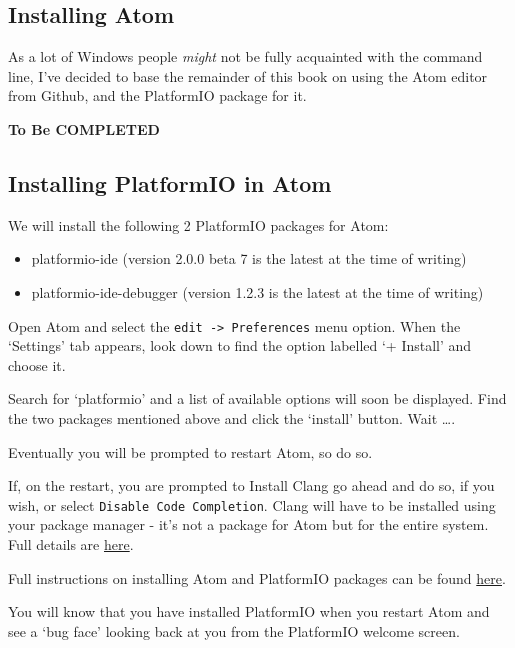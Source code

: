 \subsection{Installing Atom}\label{installing-atom}

As a lot of Windows people \emph{might} not be fully acquainted with the command
line, I've decided to base the remainder of this book on using the Atom editor
from Github, and the PlatformIO package for it. 

\textbf{To Be COMPLETED}

\subsection{Installing PlatformIO in
Atom}\label{installing-platformio-in-atom}

We will install the following 2 PlatformIO packages for Atom:

\begin{itemize}
\tightlist
\item
  platformio-ide (version 2.0.0 beta 7 is the latest at the time of
  writing)
\item
  platformio-ide-debugger (version 1.2.3 is the latest at the time of
  writing)
\end{itemize}

Open Atom and select the \lstinline!edit -> Preferences! menu option.
When the `Settings' tab appears, look down to find the option labelled
`+ Install' and choose it.

Search for `platformio' and a list of available options will soon be
displayed. Find the two packages mentioned above and click the `install'
button. Wait \ldots{}.

Eventually you will be prompted to restart Atom, so do so.

If, on the restart, you are prompted to Install Clang go ahead and do
so, if you wish, or select \lstinline!Disable Code Completion!. Clang
will have to be installed using your package manager - it's not a
package for Atom but for the entire system. Full details are
\href{http://docs.platformio.org/en/latest/ide/atom.html\#ii-clang-for-intelligent-code-completion}{here}.

Full instructions on installing Atom and PlatformIO packages can be
found
\href{http://docs.platformio.org/en/latest/ide/atom.html\#clang-for-intelligent-code-completion}{here}.

You will know that you have installed PlatformIO when you restart Atom
and see a `bug face' looking back at you from the PlatformIO welcome
screen.

